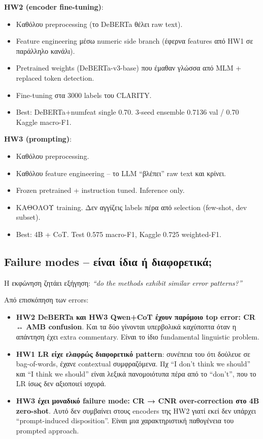 \documentclass[12pt]{fphw}
\begin{document}
\textbf{HW2 (encoder fine-tuning)}:

\begin{itemize}
    \item Καθόλου preprocessing (το DeBERTa θέλει raw text).
    \item Feature engineering μέσω numeric side branch (έφερνα features από HW1 σε παράλληλο κανάλι).
    \item Pretrained weights (DeBERTa-v3-base) που έμαθαν γλώσσα από MLM + replaced token detection.
    \item Fine-tuning στα 3000 labels του CLARITY.
    \item Best: DeBERTa+numfeat single 0.70. 3-seed ensemble 0.7136 val / 0.70 Kaggle macro-F1.
\end{itemize}

\textbf{HW3 (prompting)}:

\begin{itemize}
    \item Καθόλου preprocessing.
    \item Καθόλου feature engineering -- το LLM ``βλέπει'' raw text και κρίνει.
    \item Frozen pretrained + instruction tuned. Inference only.
    \item ΚΑΘΟΛΟΥ training. Δεν αγγίζεις labels πέρα από selection (few-shot, dev subset).
    \item Best: 4B + CoT. Test 0.575 macro-F1, Kaggle 0.725 weighted-F1.
\end{itemize}

\subsection{Failure modes -- είναι ίδια ή διαφορετικά;}

Η εκφώνηση ζητάει εξήγηση: \emph{``do the methods exhibit similar error patterns?''}

Από επισκόπηση των errors:

\begin{itemize}
    \item \textbf{HW2 DeBERTa και HW3 Qwen+CoT έχουν παρόμοιο top error: CR ↔ AMB confusion}. Και τα δύο γίνονται υπερβολικά καχύποπτα όταν η απάντηση έχει extra commentary. Είναι το ίδιο fundamental linguistic problem.
    \item \textbf{HW1 LR είχε ελαφρώς διαφορετικό pattern}: συνέπεια του ότι δούλευε σε bag-of-words, έχανε contextual συμφραζόμενα. Πχ ``I don't think we should'' και ``I think we should'' είναι λεξικά πανομοιότυπα πέρα από το ``don't'', που το LR ίσως δεν αξιοποιεί ισχυρά.
    \item \textbf{HW3 έχει μοναδικό failure mode: CR → CNR over-correction στο 4B zero-shot}. Αυτό δεν συμβαίνει στους encoders της HW2 γιατί εκεί δεν υπάρχει ``prompt-induced disposition''. Είναι μια χαρακτηριστική παθογένεια του prompted approach.
\end{itemize}
\end{document}
